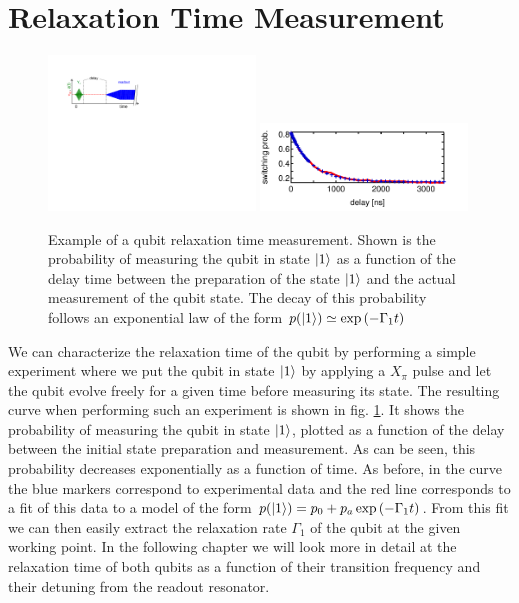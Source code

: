 \section{Relaxation Time Measurement}

\begin{figure}[ht!]
\centering
\includegraphics[width=0.49\textwidth]{"./material/figures/measurement/qubit_t1_measurement"}
\includegraphics[width=0.49\textwidth]{"./data/ct5/2011_04_21 - grover and tomo/example - qubit 2 t1"}
\caption[]{Example of a qubit relaxation time measurement. Shown is the probability of measuring the qubit in state $\left| 1 \right>$ as a function of the delay time between the preparation of the state $\left| 1 \right>$ and the actual measurement of the qubit state. The decay of this probability follows an exponential law of the form $p(\left| 1 \right>)\simeq\exp{(-\Gamma_1 t)}$}
\label{fig:qubit_t1_example}
\end{figure}

We can characterize the relaxation time of the qubit by performing a simple experiment where we put the qubit in state $\left| 1 \right>$ by applying a $X_{\pi}$ pulse and let the qubit evolve freely for a given time before measuring its state. The resulting curve when performing such an experiment is shown in fig. \ref{fig:qubit_t1_example}. It shows the probability of measuring the qubit in state $\left| 1 \right>$, plotted as a function of the delay between the initial state preparation and measurement. As can be seen, this probability decreases exponentially as a function of time. As before, in the curve the blue markers correspond to experimental data and the red line corresponds to a fit of this data to a model of the form $p(\left| 1 \right>) = p_0+p_a\exp{(-\Gamma_1 t)}$. From this fit we can then easily extract the relaxation rate $\Gamma_1$ of the qubit at the given working point. In the following chapter we will look more in detail at the relaxation time of both qubits as a function of their transition frequency and their detuning from the readout resonator.

